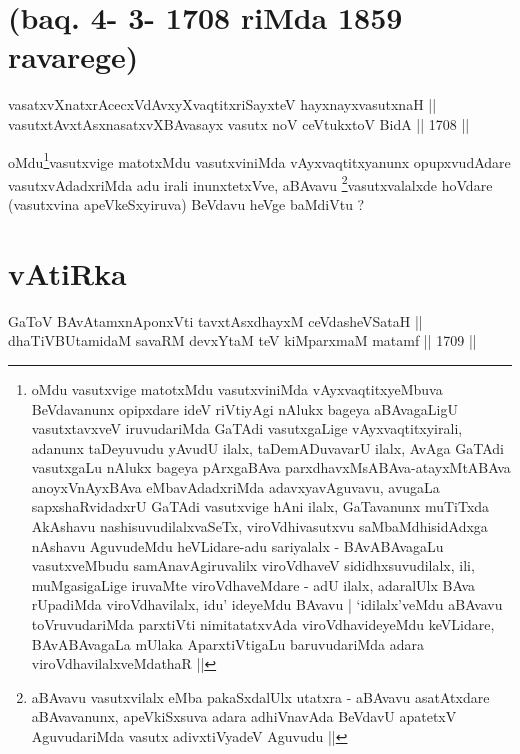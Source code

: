 
\section*{(baq. 4- 3- 1708 riMda 1859 ravarege)}


\begin{shl}
vasatxvXnatxrAcecxVdAvxyXvaqtitxriSayxteV hayxnayxvasutxnaH || \\
vasutxtAvxtAsxnasatxvXBAvasayx vasutx noV ceVtukxtoV BidA ||  1708 ||  
\end{shl}

\begin{artha}
oMdu\footnote[1]{oMdu vasutxvige matotxMdu vasutxviniMda
  vAyxvaqtitxyeMbuva BeVdavanunx opipxdare ideV riVtiyAgi nAlukx
  bageya aBAvagaLigU vasutxtavxveV iruvudariMda GaTAdi vasutxgaLige
  vAyxvaqtitxyirali, adanunx taDeyuvudu yAvudU ilalx, taDemADuvavarU
  ilalx, AvAga GaTAdi vasutxgaLu nAlukx bageya pArxgaBAva
  parxdhavxMsABAva-atayxMtABAva anoyxVnAyxBAva eMbavAdadxriMda
  adavxyavAguvavu, avugaLa sapxshaRvidadxrU GaTAdi vasutxvige hAni
  ilalx, GaTavanunx muTiTxda AkAshavu nashisuvudilalxvaSeTx,
  viroVdhivasutxvu saMbaMdhisidAdxga nAshavu AguvudeMdu heVLidare-adu
  sariyalalx - BAvABAvagaLu vasutxveMbudu samAnavAgiruvalilx
  viroVdhaveV sididhxsuvudilalx, ili, muMgasigaLige iruvaMte
  viroVdhaveMdare - adU ilalx, adaralUlx BAva rUpadiMda
  viroVdhavilalx, idu' ideyeMdu BAvavu | `idilalx'veMdu aBAvavu
  toVruvudariMda parxtiVti nimitatatxvAda viroVdhavideyeMdu keVLidare,
  BAvABAvagaLa mUlaka AparxtiVtigaLu baruvudariMda adara
  viroVdhavilalxveMdathaR ||
}vasutxvige matotxMdu vasutxviniMda
vAyxvaqtitxyanunx opupxvudAdare vasutxvAdadxriMda adu irali
inunxtetxVve, aBAvavu \footnote[2]{aBAvavu vasutxvilalx eMba
  pakaSxdalUlx utatxra - aBAvavu asatAtxdare aBAvavanunx, apeVkiSxsuva
adara adhiVnavAda BeVdavU apatetxV AguvudariMda vasutx adivxtiVyadeV
Aguvudu ||}vasutxvalalxde hoVdare (vasutxvina
apeVkeSxyiruva) BeVdavu heVge baMdiVtu ?
\end{artha}

\section*{vAtiRka}


\begin{shl}
GaToV BAvAtamxnA\s \s ponxVti tavxtAsxdhayxM ceVdasheVSataH ||  \\
dhaTiVBUtamidaM savaRM devxYtaM teV kiMparxmaM matamf ||  1709 ||  
\end{shl}

